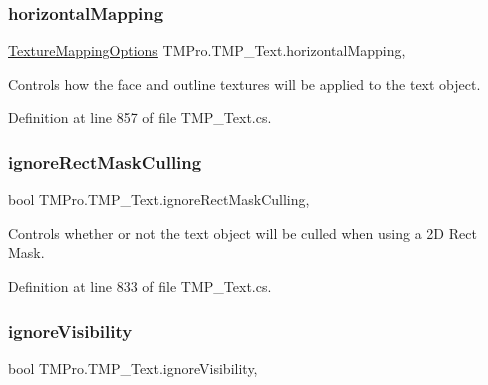 \subsubsection{\texorpdfstring{horizontalMapping}{horizontalMapping}}
{\footnotesize\ttfamily \mbox{\hyperlink{namespace_t_m_pro_ab5c7877e6f736cba8b501c877bf5b612}{Texture\+Mapping\+Options}} T\+M\+Pro.\+T\+M\+P\+\_\+\+Text.\+horizontal\+Mapping\hspace{0.3cm}{\ttfamily [get]}, {\ttfamily [set]}}



Controls how the face and outline textures will be applied to the text object. 



Definition at line 857 of file T\+M\+P\+\_\+\+Text.\+cs.

\mbox{\label{class_t_m_pro_1_1_t_m_p___text_ae26a7d66454f3871e5668b0585c0735a}} 
\subsubsection{\texorpdfstring{ignoreRectMaskCulling}{ignoreRectMaskCulling}}
{\footnotesize\ttfamily bool T\+M\+Pro.\+T\+M\+P\+\_\+\+Text.\+ignore\+Rect\+Mask\+Culling\hspace{0.3cm}{\ttfamily [get]}, {\ttfamily [set]}}



Controls whether or not the text object will be culled when using a 2D Rect Mask. 



Definition at line 833 of file T\+M\+P\+\_\+\+Text.\+cs.

\mbox{\label{class_t_m_pro_1_1_t_m_p___text_aff917246ee0ede7464a316dffd728149}} 
\subsubsection{\texorpdfstring{ignoreVisibility}{ignoreVisibility}}
{\footnotesize\ttfamily bool T\+M\+Pro.\+T\+M\+P\+\_\+\+Text.\+ignore\+Visibility\hspace{0.3cm}{\ttfamily [get]}, {\ttfamily [set]}}



